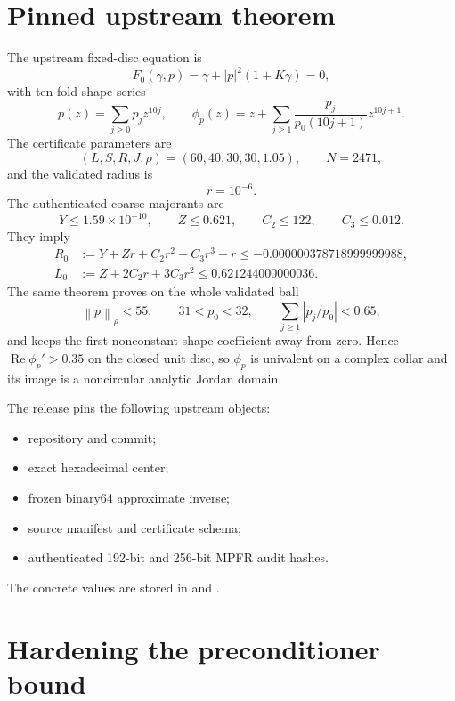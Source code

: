 \documentclass[11pt]{amsart}
\newcommand{\norm}[1]{\left\lVert #1\right\rVert}
\newcommand{\abs}[1]{\left\lvert #1\right\rvert}
\newcommand{\Rea}{\operatorname{Re}}
\begin{document}
\section{Pinned upstream theorem}

The upstream fixed-disc equation is
\begin{equation}\label{eq:F0}
  F_0(\gamma,p)=\gamma+\abs p^2(1+K\gamma)=0,
\end{equation}
with ten-fold shape series
\[
  p(z)=\sum_{j\ge0}p_jz^{10j},
  \qquad
  \phi_p(z)=z+\sum_{j\ge1}
  \frac{p_j}{p_0(10j+1)}z^{10j+1}.
\]
The certificate parameters are
\[
  (L,S,R,J,\rho)=(60,40,30,30,1.05),
  \qquad N=2471,
\]
and the validated radius is
\[
  r=10^{-6}.
\]
The authenticated coarse majorants are
\begin{equation}\label{eq:coarse}
  Y\le1.59\times10^{-10},
  \qquad Z\le0.621,
  \qquad C_2\le122,
  \qquad C_3\le0.012.
\end{equation}
They imply
\begin{align}
  R_0&:=Y+Zr+C_2r^2+C_3r^3-r
  \le-0.000000378718999999988,
  \label{eq:R0}\\
  L_0&:=Z+2C_2r+3C_3r^2
  \le0.621244000000036.
  \label{eq:L0}
\end{align}
The same theorem proves on the whole validated ball
\begin{equation}\label{eq:geometry}
  \norm p_\rho<55,
  \qquad 31<p_0<32,
  \qquad
  \sum_{j\ge1}\abs{p_j/p_0}<0.65,
\end{equation}
and keeps the first nonconstant shape coefficient away from zero.  Hence
$\Rea\phi_p'>0.35$ on the closed unit disc, so $\phi_p$ is univalent on a
complex collar and its image is a noncircular analytic Jordan domain.

The release pins the following upstream objects:
\begin{itemize}[leftmargin=2em]
  \item repository and commit;
  \item exact hexadecimal center;
  \item frozen binary64 approximate inverse;
  \item source manifest and certificate schema;
  \item authenticated 192-bit and 256-bit MPFR audit hashes.
\end{itemize}
The concrete values are stored in
 and
.

\section{Hardening the preconditioner bound}
\end{document}
